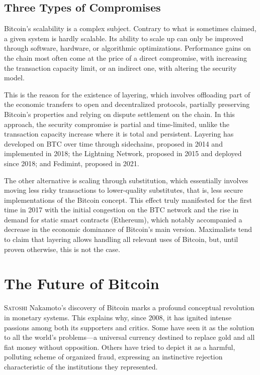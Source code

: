 \documentclass[
  a5paper,
  smalldemyvopaper,10pt,twoside,onecolumn,openright,extrafontsizes,hidelinks]{memoir}
\begin{document}
\section*{Three Types of Compromises}\label{three-types-of-compromises}


Bitcoin's scalability is a complex subject. Contrary to what is
sometimes claimed, a given system is hardly scalable. Its ability to
scale up can only be improved through software, hardware, or algorithmic
optimizations. Performance gains on the chain most often come at the
price of a direct compromise, with increasing the transaction capacity
limit, or an indirect one, with altering the security model.

This is the reason for the existence of layering, which involves
offloading part of the economic transfers to open and decentralized
protocols, partially preserving Bitcoin's properties and relying on
dispute settlement on the chain. In this approach, the security
compromise is partial and time-limited, unlike the transaction capacity
increase where it is total and persistent. Layering has developed on BTC
over time through sidechains, proposed in 2014 and implemented in 2018;
the Lightning Network, proposed in 2015 and deployed since 2018; and
Fedimint, proposed in 2021.

The other alternative is scaling through substitution, which essentially
involves moving less risky transactions to lower-quality substitutes,
that is, less secure implementations of the Bitcoin concept. This effect
truly manifested for the first time in 2017 with the initial congestion
on the BTC network and the rise in demand for static smart contracts
(Ethereum), which notably accompanied a decrease in the economic
dominance of Bitcoin's main version. Maximalists tend to claim that
layering allows handling all relevant uses of Bitcoin, but, until proven
otherwise, this is not the case.


\chapter{The Future of Bitcoin}\label{ch:avenir}

\label{enotezch:15}{}

{S}\textsc{atoshi} Nakamoto's discovery of Bitcoin marks a profound
conceptual revolution in monetary systems. This explains why, since
2008, it has ignited intense passions among both its supporters and
critics. Some have seen it as the solution to all the world's
problems---a universal currency destined to replace gold and all fiat
money without opposition. Others have tried to depict it as a harmful,
polluting scheme of organized fraud, expressing an instinctive rejection
characteristic of the institutions they represented.
\end{document}

